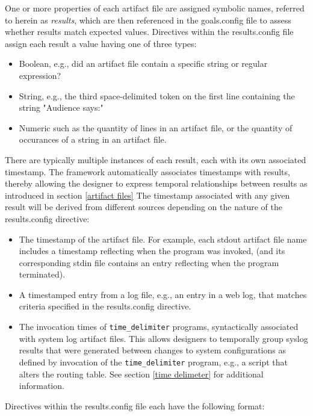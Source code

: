 \documentclass[12pt]{article}
\begin{document}
One or more properties of each artifact file are assigned symbolic names, referred to herein as \textit{results}, which 
are then referenced in the goals.config file to assess whether results match expected values.  Directives within the
results.config file assign each result a value having one of three types:
\begin{itemize}
\item Boolean, e.g., did an artifact file contain a specific string or regular expression?
\item String, e.g., the third space-delimited token on the first line containing the string "Audience says:"
\item Numeric such as the quantity of lines in an artifact file, or the quantity of occurances of a string in an artifact file.
\end{itemize} 

There are typically multiple instances of each result, each with its own associated timestamp. The framework automatically
associates timestamps with results, thereby allowing the designer to express temporal relationships between results
as introduced in section \ref{artifact files} The timestamp associated with any given result will be derived from different
sources depending on the nature of the results.config directive:
\begin{itemize}
\item The timestamp of the artifact file.  For example, each stdout artifact file name includes a timestamp reflecting when the
program was invoked, (and its corresponding stdin file contains an entry reflecting when the program terminated).
\item A timestamped entry from a log file, e.g., an entry in a web log, that matches criteria specified in the results.config
directive.
\item The invocation times of {\tt time\_delimiter} programs, syntactically associated with system log artifact files.
This allows designers to temporally group syslog results that were generated between changes to system configurations
as defined by invocation of the {\tt time\_delimiter} program, e.g., a script that alters the routing table.  See section 
\ref{time delimeter} for additional information. 
\end{itemize}

Directives within the results.config file each have the following format:
\end{document}
